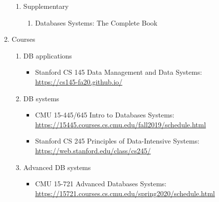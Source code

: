 \documentclass{article}
\begin{document}
\begin{enumerate}
\begin{enumerate}
    \item Supplementary
        \begin{enumerate}
            \item Databases Systems: The Complete Book
            \cite{garcia2008database}
        \end{enumerate}
    \end{enumerate}
    \item Courses
    \begin{enumerate}
        \item DB applications
        \begin{itemize}
            \item Stanford CS 145 Data Management and Data Systems:\\
            \href{https://cs145-fa20.github.io/}{https://cs145-fa20.github.io/}
        \end{itemize}
        \item DB systems
        \begin{itemize}
            \item CMU 15-445/645 Intro to Databases Systems:\\
            \href{https://15445.courses.cs.cmu.edu/fall2019/schedule.html}{https://15445.courses.cs.cmu.edu/fall2019/schedule.html}
            \item Stanford CS 245 Principles of Data-Intensive Systems:\\
            \href{https://web.stanford.edu/class/cs245/}{https://web.stanford.edu/class/cs245/}
        \end{itemize}
            \item Advanced DB systems
            \begin{itemize}
                \item CMU 15-721 Advanced Databases Systems:\\
                \href{https://15721.courses.cs.cmu.edu/spring2020/schedule.html}{https://15721.courses.cs.cmu.edu/spring2020/schedule.html}        
            \end{itemize}
    \end{enumerate}


\end{enumerate}
\end{document}
